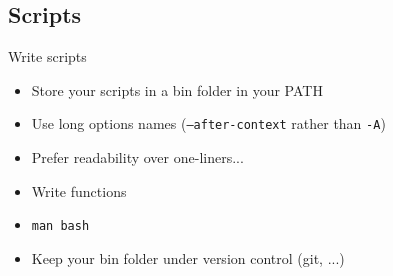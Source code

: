 \subsection{Scripts}

\begin{frame}[fragile]{Write scripts}
\begin{itemize}
  \pause \item Store your scripts in a bin folder in your PATH
  \pause \item Use long options names (\texttt{--after-context} rather than \texttt{-A})
  \pause \item Prefer readability over one-liners...
  \pause \item Write functions
  \pause \item \texttt{man bash}
  \pause \item Keep your bin folder under version control (git, ...)
\end{itemize}
\end{frame}

